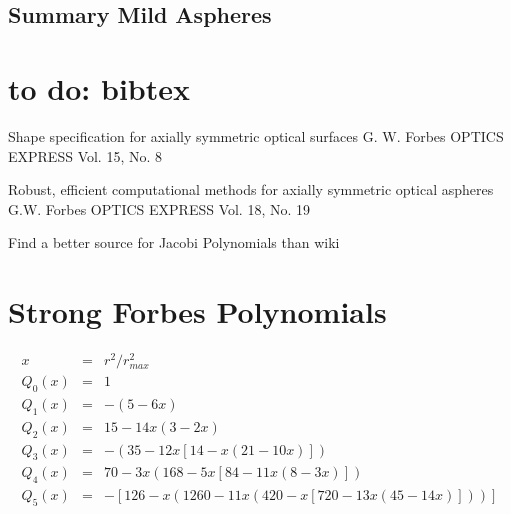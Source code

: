\documentclass[10pt]{revtex4-1}
\renewcommand\r{r}
\newcommand\rmax{r_{max}}
\begin{document}
\subsection{Summary Mild Aspheres}


\section{to do: bibtex}
Shape specification for axially symmetric optical surfaces
G. W. Forbes
OPTICS EXPRESS Vol. 15, No. 8

Robust, efficient computational methods
for axially symmetric optical aspheres
G.W. Forbes
OPTICS EXPRESS Vol. 18, No. 19 

Find a better source for Jacobi Polynomials than wiki


\appendix
\section{Strong Forbes Polynomials}

\begin{eqnarray}
x &=& \r^2 / \rmax^2 \\
Q_0(x) &=& 1 \\
Q_1(x) &=& - (5 - 6x) \\
Q_2(x) &=& 15 - 14x (3 - 2x) \\
Q_3(x) &=& -(35-12x [14 - x (21-10x)]) \\
Q_4(x) &=& 70 - 3x (168- 5x[84 -11x (8 - 3x)]) \\
Q_5(x) &=& -[126 - x (1260-11x (420- x[720 -13x (45-14x)]))]
\end{eqnarray}
\end{document}
